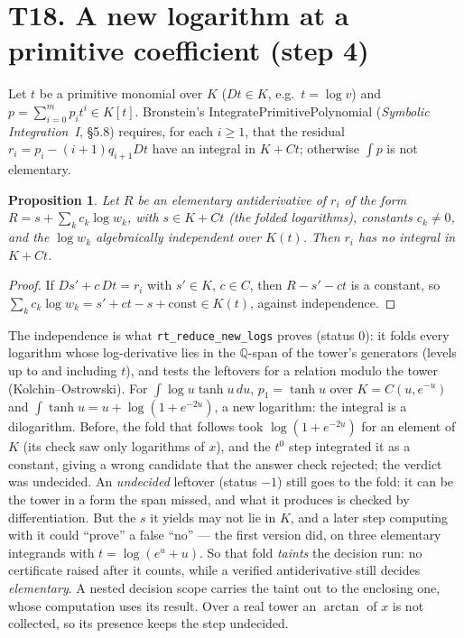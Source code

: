 \documentclass[11pt]{article}
\newtheorem{proposition}[theorem]{Proposition}
\theoremstyle{definition}
\theoremstyle{remark}
\newcommand{\code}[1]{\texttt{#1}}
\begin{document}
\section*{T18. A new logarithm at a primitive coefficient (step 4)}
\label{sec:T18}

Let $t$ be a primitive monomial over $K$ ($Dt\in K$, e.g.\ $t=\log v$) and
$p=\sum_{i=0}^m p_i t^i\in K[t]$. Bronstein's IntegratePrimitivePolynomial
(\emph{Symbolic Integration~I}, \S5.8) requires, for each $i\ge1$, that the residual
$r_i=p_i-(i+1)q_{i+1}Dt$ have an integral in $K+Ct$; otherwise $\int p$ is not elementary.

\begin{proposition}\label{prop:T18}
Let $R$ be an elementary antiderivative of $r_i$ of the form
$R=s+\sum_k c_k\log w_k$, with $s\in K+Ct$ (the folded logarithms), constants $c_k\ne0$, and the $\log w_k$
algebraically independent over $K(t)$. Then $r_i$ has no integral in $K+Ct$.
\end{proposition}
\begin{proof}
If $Ds'+c\,Dt=r_i$ with $s'\in K$, $c\in C$, then $R-s'-ct$ is a constant, so
$\sum_k c_k\log w_k = s'+ct-s+\text{const}\in K(t)$, against independence.
\end{proof}
\noindent The independence is what \code{rt\_reduce\_new\_logs} proves (status 0): it folds
every logarithm whose log-derivative lies in the $\mathbb{Q}$-span of the tower's
generators (levels up to and including $t$), and tests the leftovers for a relation
modulo the tower (Kolchin--Ostrowski). For $\int\log u\tanh u\,du$, $p_1=\tanh u$ over
$K=C(u,e^{-u})$ and $\int\tanh u=u+\log(1+e^{-2u})$, a new logarithm: the integral is a
dilogarithm. Before, the fold that follows took $\log(1+e^{-2u})$ for an element of $K$
(its check saw only logarithms of $x$), and the $t^0$ step integrated it as a constant,
giving a wrong candidate that the answer check rejected; the verdict was undecided. An
\emph{undecided} leftover (status $-1$) still goes to the fold: it can be the tower in a
form the span missed, and what it produces is checked by differentiation. But the $s$ it
yields may not lie in $K$, and a later step computing with it could ``prove'' a false
``no'' --- the first version did, on three elementary integrands with $t=\log(e^u+u)$.
So that fold \emph{taints} the decision run: no certificate raised after it counts,
while a verified antiderivative still decides \emph{elementary}. A nested decision
scope carries the taint out to the enclosing one, whose computation uses its result.
Over a real tower an $\arctan$ of $x$ is not collected, so its presence keeps the step
undecided.
\end{document}
